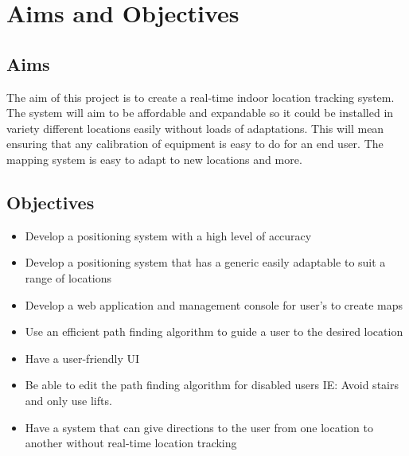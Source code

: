 \section{Aims and Objectives}
		\subsection{Aims}
		The aim of this project is to create a real-time indoor location tracking system. The system will aim to be affordable and expandable so it could be installed in variety different locations easily without loads of adaptations. This will mean ensuring that any calibration of equipment is easy to do for an end user. The mapping system is easy to adapt to new locations and more.

		\subsection{Objectives}
		\begin{itemize}
			\item Develop a positioning system with a high level of accuracy
			\item Develop a positioning system that has a generic easily adaptable to suit a range of locations
			\item Develop a web application and management console for user’s to create maps
			\item Use an efficient path finding algorithm to guide a user to the desired location
			\item Have a user-friendly UI
			\item Be able to edit the path finding algorithm for disabled users IE: Avoid stairs and only use lifts.
			\item Have a system that can give directions to the user from one location to another without real-time location tracking
		\end{itemize}
		\newpage